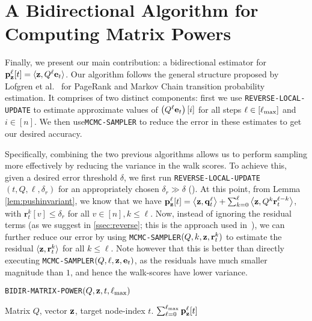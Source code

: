 
\section{A Bidirectional Algorithm for Computing Matrix Powers}
\label{ssec:bidiralgo}

Finally, we present our main contribution: a bidirectional estimator for ${\mathbf{p}}_\mathbf{z}^{\ell}[t] = \langle\mathbf{z},Q^{\ell}\mathbf{e}_t\rangle$. 
Our algorithm follows the general structure proposed by Lofgren et al.~\cite{Lofgren2014,banerjee2015fast} for PageRank and Markov Chain transition probability estimation.
It comprises of two distinct components: first we use \texttt{REVERSE-LOCAL-UPDATE} to estimate approximate values of $\left(Q^{\ell}\mathbf{e}_t\right)[i]$ for all steps $\ell \in[\ell_{\max}]$ and $i\in[n]$. 
We then use\texttt{MCMC-SAMPLER} to reduce the error in these estimates to get our desired accuracy.


Specifically, combining the two previous algorithms allows us to perform sampling more effectively by reducing the variance in the walk scores.
To achieve this, given a desired error threshold $\delta$, we first run \texttt{REVERSE-LOCAL-UPDATE}$(t,Q,\ell,\delta_r)$ for an appropriately chosen $\delta_r\gg\delta$ (). 
At this point, from Lemma \ref{lem:pushinvariant}, we know that we have
${\mathbf{p}}_\mathbf{z}^{\ell}[t] = \left< \mathbf{z}, \mathbf{q}_t^{\ell} \right> + \sum_{k=0}^{\ell} \left<\mathbf{z}, Q^k\mathbf{r}_t^{\ell-k}\right>$, with $\mathbf{r}_t^{k}[v]\leq\delta_r$ for all $v\in[n],k\leq\ell$.
Now, instead of ignoring the residual terms (as we suggest in \ref{ssec:reverse}; this is the approach used in~\cite{andersen2007local,lee2014asynchronous}), we can further reduce our error by using \texttt{MCMC-SAMPLER}$(Q,k,\mathbf{z},\mathbf{r}_t^k)$ to estimate the residual $\langle\mathbf{z},\mathbf{r}_t^k\rangle$ for all $k\leq\ell$.
Note however that this is better than directly executing \texttt{MCMC-SAMPLER}$(Q,\ell,\mathbf{z},\mathbf{e}_{t})$, as the residuals have much smaller magnitude than $1$, and hence the walk-scores have lower variance.
\begin{algorithm}[ht]
\caption{\texttt{BIDIR-MATRIX-POWER}$(Q, \mathbf{z}, t,\ell_{\max})$}
\label{alg:linearsysest}
\begin{algorithmic}[1]
\REQUIRE Matrix $Q$, vector $\mathbf{z}$, target node-index $t$.
\ENDFOR
{}
\ENDFOR
\RETURN $\sum_{\ell=0}^{\ell_{\max}} {\mathbf{p}}_\mathbf{z}^{\ell}[t]$ 
\end{algorithmic}
\end{algorithm} 

